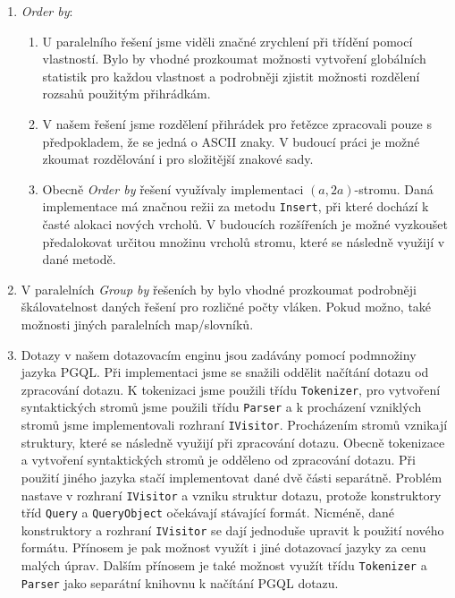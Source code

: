 \begin{enumerate}
\item \textit{Order by}:
\begin{enumerate}

\item
U paralelního řešení jsme viděli značné zrychlení při třídění pomocí vlastností.
Bylo by vhodné prozkoumat možnosti vytvoření globálních statistik pro každou vlastnost a podrobněji zjistit možnosti rozdělení rozsahů použitým přihrádkám.
\item
V našem řešení jsme rozdělení přihrádek pro řetězce zpracovali pouze s předpokladem, že se jedná o ASCII znaky.
V budoucí práci je možné zkoumat rozdělování i pro složitější znakové sady.
\item
Obecně \textit{Order by} řešení využívaly implementaci $(a, 2a)$-stromu.
Daná implementace má značnou režii za metodu \texttt{Insert}, při které dochází k časté alokaci nových vrcholů.
V budoucích rozšířeních je možné vyzkoušet předalokovat určitou množinu vrcholů stromu, které se následně využijí v dané metodě.
\end{enumerate}

\item V paralelních \textit{Group by} řešeních by bylo vhodné prozkoumat podrobněji škálovatelnost daných řešení pro rozličné počty vláken.
Pokud možno, také možnosti jiných paralelních map/slovníků.
 
\item
Dotazy v našem dotazovacím enginu jsou zadávány pomocí podmnožiny jazyka PGQL.
Při implementaci jsme se snažili oddělit načítání dotazu od zpracování dotazu.
K tokenizaci jsme použili třídu \texttt{Tokenizer}, pro vytvoření syntaktických stromů jsme použili třídu \texttt{Parser} a k procházení vzniklých stromů jsme implementovali rozhraní \texttt{IVisitor}.
Procházením stromů vznikají struktury, které se následně využijí při zpracování dotazu.
Obecně tokenizace a vytvoření syntaktických stromů je odděleno od zpracování dotazu.
Při použití jiného jazyka stačí implementovat dané dvě části separátně.
Problém nastave v rozhraní \texttt{IVisitor} a vzniku struktur dotazu, protože konstruktory tříd \texttt{Query} a \texttt{QueryObject} očekávají stávající formát.
Nicméně, dané konstruktory a rozhraní \texttt{IVisitor} se dají jednoduše upravit k použití nového formátu.
Přínosem je pak možnost využít i jiné dotazovací jazyky za cenu malých úprav.
Dalším přínosem je také možnost využít třídu \texttt{Tokenizer} a \texttt{Parser} jako separátní knihovnu k načítání PGQL dotazu.

\end{enumerate}



